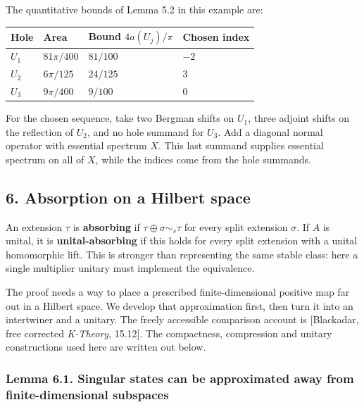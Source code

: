 \documentclass[
  11pt,
]{article}
\newcounter{none} %
\begin{document}
The quantitative bounds of Lemma 5.2 in this example are:

{\def\LTcaptype{none} %
\begin{longtable}[]{@{}llll@{}}
\toprule\noalign{}
Hole & Area & Bound \(4a(U_j)/\pi\) & Chosen index \\
\midrule\noalign{}
\endhead
\bottomrule\noalign{}
\endlastfoot
\(U_1\) & \(81\pi/400\) & \(81/100\) & \(-2\) \\
\(U_2\) & \(6\pi/125\) & \(24/125\) & \(3\) \\
\(U_3\) & \(9\pi/400\) & \(9/100\) & \(0\) \\
\end{longtable}
}

For the chosen sequence, take two Bergman shifts on \(U_1\), three
adjoint shifts on the reflection of \(U_2\), and no hole summand for
\(U_3\). Add a diagonal normal operator with essential spectrum \(X\).
This last summand supplies essential spectrum on all of \(X\), while the
indices come from the hole summands.

\subsection{6. Absorption on a Hilbert
space}\label{absorption-on-a-hilbert-space}

An extension \(\tau\) is \textbf{absorbing} if
\(\tau\oplus\sigma\sim_s\tau\) for every split extension \(\sigma\). If
\(A\) is unital, it is \textbf{unital-absorbing} if this holds for every
split extension with a unital homomorphic lift. This is stronger than
representing the same stable class: here a single multiplier unitary
must implement the equivalence.

The proof needs a way to place a prescribed finite-dimensional positive
map far out in a Hilbert space. We develop that approximation first,
then turn it into an intertwiner and a unitary. The freely accessible
comparison account is {[}Blackadar, free corrected \emph{K-Theory},
15.12{]}. The compactness, compression and unitary constructions used
here are written out below.

\subsubsection{Lemma 6.1. Singular states can be approximated away from
finite-dimensional
subspaces}\label{lemma-6.1.-singular-states-can-be-approximated-away-from-finite-dimensional-subspaces}
\end{document}
